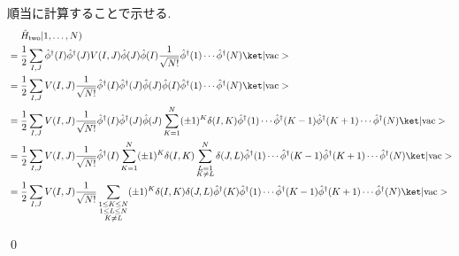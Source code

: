 \documentclass[uplatex,dvipdfmx,a4paper,11pt]{jlreq}
\makeatletter
\numberwithin{equation}{section}
\theoremstyle{definition}
\renewenvironment{proof}[1][\proofname]{\par
  \normalfont
  \topsep6\p@\@plus6\p@ \trivlist
  \item[\hskip\labelsep{\bfseries #1}\@addpunct{\bfseries}]\ignorespaces\quad\par
}{
  \qed\endtrivlist\@endpefalse
}
\renewcommand\proofname{証明}
\makeatother
\begin{document}
\begin{proof}
  順当に計算することで示せる.
  \begin{align}
     & \quad\ \hat{H}_{\mathrm{two}}|1,\ldots,N)                                                                                                                                                                                                                                 \\
     & = \frac{1}{2}\sum_{I,J}\hat{\phi}^\dagger(I)\hat{\phi}^\dagger(J)V(I, J)\hat{\phi}(J)\hat{\phi}(I)\frac{1}{\sqrt{N!}}\hat{\phi}^\dagger(1)\cdots\hat{\phi}^\dagger(N)\ket|\mathrm{vac}>                                                                                   \\
     & = \frac{1}{2}\sum_{I,J}V(I, J)\frac{1}{\sqrt{N!}}\hat{\phi}^\dagger(I)\hat{\phi}^\dagger(J)\hat{\phi}(J)\hat{\phi}(I)\hat{\phi}^\dagger(1)\cdots\hat{\phi}^\dagger(N)\ket|\mathrm{vac}>                                                                                   \\
     & = \frac{1}{2}\sum_{I,J}V(I, J)\frac{1}{\sqrt{N!}}\hat{\phi}^\dagger(I)\hat{\phi}^\dagger(J)\hat{\phi}(J)\sum_{K = 1}^{N}(\pm 1)^{K}\delta(I, K)\hat{\phi}^\dagger(1)\cdots\hat{\phi}^\dagger(K - 1)\hat{\phi}^\dagger(K + 1)\cdots\hat{\phi}^\dagger(N)\ket|\mathrm{vac}> \\
     & = \frac{1}{2}\sum_{I,J}V(I, J)\frac{1}{\sqrt{N!}}\hat{\phi}^\dagger(I)\sum_{K = 1}^{N}(\pm 1)^{K}\delta(I, K)\sum_{\substack{L = 1                                                                                                                                        \\ K \neq L}}^{N}\delta(J, L)\hat{\phi}^\dagger(1)\cdots\hat{\phi}^\dagger(K - 1)\hat{\phi}^\dagger(K + 1)\cdots\hat{\phi}^\dagger(N)\ket|\mathrm{vac}>                                                                                                                                              \\
     & = \frac{1}{2}\sum_{I,J}V(I, J)\frac{1}{\sqrt{N!}}\sum_{\substack{1\leq K\leq N                                                                                                                                                                                            \\ 1\leq L\leq N \\ K \neq L}}(\pm 1)^{K}\delta(I, K)\delta(J, L)\hat{\phi}^\dagger(K)\hat{\phi}^\dagger(1)\cdots\hat{\phi}^\dagger(K - 1)\hat{\phi}^\dagger(K + 1)\cdots\hat{\phi}^\dagger(N)\ket|\mathrm{vac}>                                                                        \\

\end{align}
\end{proof}
\end{document}
